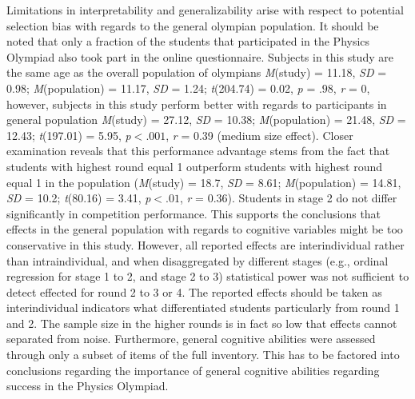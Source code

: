 \documentclass[C:/Users/Peter/Desktop/winners/IPhO1718/paper/probsol_paper/main/TaylorFrancis/interactapasample]{subfiles}
\begin{document}
Limitations in interpretability and generalizability arise with respect to potential selection bias with regards to the general olympian population. It should be noted that only a fraction of the students that participated in the Physics Olympiad also took part in the online questionnaire. Subjects in this study are the same age as the overall population of olympians \textit{M}(study) = 11.18, \textit{SD} = 0.98; \textit{M}(population) = 11.17, \textit{SD} = 1.24; \textit{t}(204.74) = 0.02, \textit{p} = $.98$, \textit{r} = 0, however, subjects in this study perform better with regards to participants in general population \textit{M}(study) = 27.12, \textit{SD} = 10.38; \textit{M}(population) = 21.48, \textit{SD} = 12.43; \textit{t}(197.01) = 5.95, \textit{p}$<.001$, \textit{r} = 0.39 (medium size effect). Closer examination reveals that this performance advantage stems from the fact that students with highest round equal 1 outperform students with highest round equal 1 in the population (\textit{M}(study) = 18.7, \textit{SD} = 8.61; \textit{M}(population) = 14.81, \textit{SD} = 10.2; \textit{t}(80.16) = 3.41, \textit{p}$<.01$, \textit{r} = 0.36). Students in stage 2 do not differ significantly in competition performance. This supports the conclusions that effects in the general population with regards to cognitive variables might be too conservative in this study. However, all reported effects are interindividual rather than intraindividual, and when disaggregated by different stages (e.g., ordinal regression for stage 1 to 2, and stage 2 to 3) statistical power was not sufficient to detect effected for round 2 to 3 or 4. The reported effects should be taken as interindividual indicators what differentiated students particularly from round 1 and 2. The sample size in the higher rounds is in fact so low that effects cannot separated from noise. Furthermore, general cognitive abilities were assessed through only a subset of items of the full inventory. This has to be factored into conclusions regarding the importance of general cognitive abilities regarding success in the Physics Olympiad.
\end{document}
